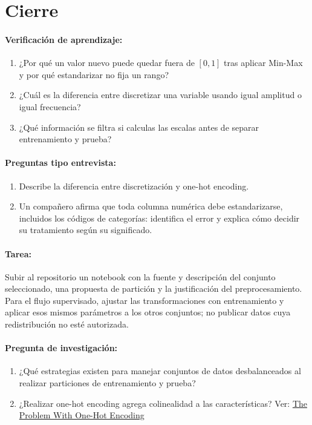 \documentclass[a4,11pt]{aleph-notas}
\begin{document}
\section*{Cierre}

\paragraph{Verificación de aprendizaje:}
\begin{enumerate}[leftmargin=*]
    \item ¿Por qué un valor nuevo puede quedar fuera de $[0,1]$ tras aplicar Min-Max y por qué estandarizar no fija un rango?

    \item ¿Cuál es la diferencia entre discretizar una variable usando igual amplitud o igual frecuencia?

    \item ¿Qué información se filtra si calculas las escalas antes de separar entrenamiento y prueba?
\end{enumerate}

\paragraph{Preguntas tipo entrevista:}
\begin{enumerate}[leftmargin=*]
    \item Describe la diferencia entre discretización y one-hot encoding.

    \item Un compañero afirma que toda columna numérica debe estandarizarse, incluidos los códigos de categorías: identifica el error y explica cómo decidir su tratamiento según su significado.
\end{enumerate}

\paragraph{Tarea:}
    Subir al repositorio un notebook con la fuente y descripción del conjunto seleccionado, una propuesta de partición y la justificación del preprocesamiento. Para el flujo supervisado, ajustar las transformaciones con entrenamiento y aplicar esos mismos parámetros a los otros conjuntos; no publicar datos cuya redistribución no esté autorizada.

\paragraph{Pregunta de investigación:}
\begin{enumerate}[leftmargin=*]
    \item ¿Qué estrategias existen para manejar conjuntos de datos desbalanceados al realizar particiones de entrenamiento y prueba?
    \item ¿Realizar one-hot encoding agrega colinealidad a las características? Ver: \href{https://blog.dailydoseofds.com/p/the-most-overlooked-problem-with}{The Problem With One-Hot Encoding}
\end{enumerate}
\end{document}
